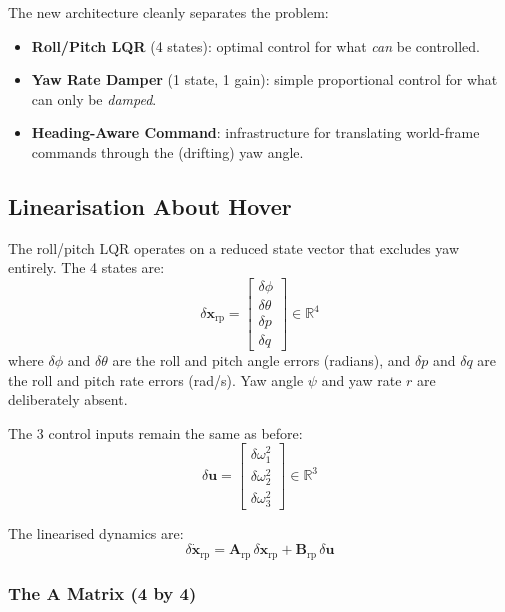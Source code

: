 \documentclass[12pt, a4paper]{article}
\newcommand{\R}{\mathbb{R}}
\newcommand{\bx}{\bm{x}}
\newcommand{\bu}{\bm{u}}
\newcommand{\bA}{\bm{A}}
\newcommand{\bB}{\bm{B}}
\begin{document}
The new architecture cleanly separates the problem:
\begin{itemize}
    \item \textbf{Roll/Pitch LQR} (4 states): optimal control for what \emph{can} be controlled.
    \item \textbf{Yaw Rate Damper} (1 state, 1 gain): simple proportional control for what can only be \emph{damped}.
    \item \textbf{Heading-Aware Command}: infrastructure for translating world-frame commands through the (drifting) yaw angle.
\end{itemize}

\subsection{Linearisation About Hover}

The roll/pitch LQR operates on a reduced state vector that excludes yaw entirely.  The 4 states are:
\begin{equation}
    \delta \bx_{\text{rp}} = \begin{bmatrix}
        \delta\phi \\ \delta\theta \\ \delta p \\ \delta q
    \end{bmatrix}
    \in \R^4
\end{equation}
where $\delta\phi$ and $\delta\theta$ are the roll and pitch angle errors (radians), and $\delta p$ and $\delta q$ are the roll and pitch rate errors (rad/s).  Yaw angle $\psi$ and yaw rate $r$ are deliberately absent.

The 3 control inputs remain the same as before:
\begin{equation}
    \delta \bu = \begin{bmatrix} \delta\omega_1^2 \\ \delta\omega_2^2 \\ \delta\omega_3^2 \end{bmatrix} \in \R^3
\end{equation}

The linearised dynamics are:
\begin{equation}
    \delta \dot{\bx}_{\text{rp}} = \bA_{\text{rp}} \, \delta \bx_{\text{rp}} + \bB_{\text{rp}} \, \delta \bu
\end{equation}

\subsubsection{The A Matrix (4 by 4)}
\end{document}
